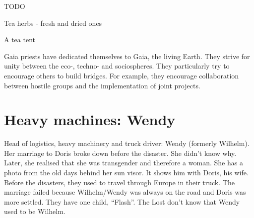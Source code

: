 \begin{npcBox}[title=Laura, Gaianistin]
    \begin{stunts}
    \item {}
    \end{stunts}

    \begin{stressSection}
    \end{stressSection}
    \begin{tabularx}{\textwidth}{ XX }
    \end{tabularx}

    \begin{consequences}
    \item {}
    \item {}
    \item {}
    \end{consequences}

    \begin{npcDescription}
    TODO
    \end{npcDescription}


    \begin{equipment}
    \item Tea herbs - fresh and dried ones
    \item A tea tent
    \end{equipment}
\end{npcBox}


Gaia priests have dedicated themselves to Gaia, the living Earth. They strive for unity between the eco-, techno- and sociospheres. They particularly try to encourage others to build bridges. For example, they encourage collaboration between hostile groups and the implementation of joint projects.

\newpage


\section{Heavy machines: Wendy}

Head of logistics, heavy machinery and truck driver: Wendy (formerly Wilhelm). Her marriage to Doris broke down before the disaster. She didn't know why. Later, she realised that she was transgender and therefore a woman. She has a photo from the old days behind her sun visor. It shows him with Doris, his wife. Before the disasters, they used to travel through Europe in their truck. The marriage failed because Wilhelm/Wendy was always on the road and Doris was more settled. They have one child, “Flash”. The Lost don't know that Wendy used to be Wilhelm.

